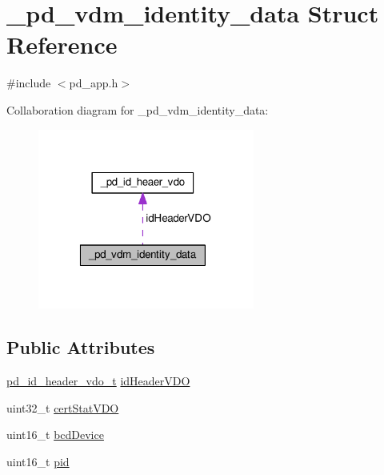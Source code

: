 \hypertarget{struct__pd__vdm__identity__data}{\section{\-\_\-pd\-\_\-vdm\-\_\-identity\-\_\-data Struct Reference}
\label{struct__pd__vdm__identity__data}
}


{\ttfamily \#include $<$pd\-\_\-app.\-h$>$}



Collaboration diagram for \-\_\-pd\-\_\-vdm\-\_\-identity\-\_\-data\-:
\nopagebreak
\begin{figure}[H]
\begin{center}
\leavevmode
\includegraphics[width=202pt]{struct__pd__vdm__identity__data__coll__graph}
\end{center}
\end{figure}
\subsection*{Public Attributes}
\begin{DoxyCompactItemize}
\item 
\hyperlink{pd__app_8h_a7dd83e28d2ebeab4fe2166767ff8befd}{pd\-\_\-id\-\_\-header\-\_\-vdo\-\_\-t} \hyperlink{struct__pd__vdm__identity__data_a1a5bca628bc1dca775f43f351328892e}{id\-Header\-V\-D\-O}
\item 
uint32\-\_\-t \hyperlink{struct__pd__vdm__identity__data_a0d79e90688b2dbf6675f8efb6ac6c973}{cert\-Stat\-V\-D\-O}
\item 
uint16\-\_\-t \hyperlink{struct__pd__vdm__identity__data_a2f30cd86743fe79ef17a8f660dbd3fd9}{bcd\-Device}
\item 
uint16\-\_\-t \hyperlink{struct__pd__vdm__identity__data_a77971a31b11bad8e3cfc5b159ea98360}{pid}
\end{DoxyCompactItemize}


